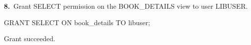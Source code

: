 \noindent\begin{minipage}{\linewidth}
\begingroup{}
{\fontsize{14}{17}\selectfont\textbf{8.}}\ Grant SELECT permission on the BOOK\_DETAILS view to user LIBUSER.\par
\endgroup\vspace{12pt}


\begin{sqlcode}
GRANT SELECT ON book_details TO libuser;
\end{sqlcode}

\vspace{18pt}


\begin{sqlout}[fontsize=\small]
Grant succeeded.
\end{sqlout}
\end{minipage}\par\vspace{24pt}

